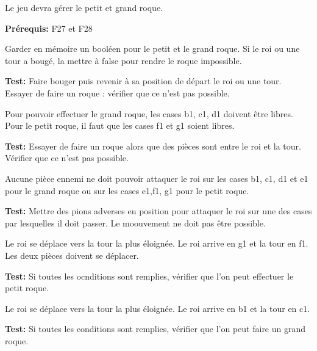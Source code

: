 \documentclass{article}
\begin{document}
\begin{needbox}[F30. Roque]
    Le jeu devra gérer le petit et grand roque.

    \textbf{Prérequis:} F27 et F28
    \begin{subneedbox}
        Garder en mémoire un booléen pour le petit et le grand roque.
        Si le roi ou une tour a bougé, la mettre à false pour rendre le roque impossible.

        \textbf{Test:} Faire bouger puis revenir à sa position de départ
         le roi ou une tour. Essayer de faire un roque : vérifier que ce n'est pas possible.
    \end{subneedbox}
    \begin{subneedbox}
        Pour pouvoir effectuer le grand roque, les cases b1, c1, d1 doivent être libres.
        Pour le petit roque, il faut que les cases f1 et g1 soient libres.

        \textbf{Test:} Essayer de faire un roque alors que des pièces sont entre
        le roi et la tour. Vérifier que ce n'est pas possible.
    \end{subneedbox}
    \begin{subneedbox}
        Aucune pièce ennemi ne doit pouvoir attaquer le roi sur les cases b1, c1, d1 
        et e1 pour le grand roque ou sur les cases e1,f1, g1 pour le petit roque.

        \textbf{Test:} Mettre des pions adverses en position pour attaquer le roi sur une des cases
        par lesquelles il doit passer. Le moouvement ne doit pas être possible.
    \end{subneedbox}
    \begin{subneedbox}
        Le roi se déplace vers la tour la plus éloignée. Le roi arrive en g1 et 
        la tour en f1. Les deux pièces doivent se déplacer.

        \textbf{Test:} Si toutes les ocnditions sont remplies, vérifier que l'on
         peut effectuer le petit roque.
    \end{subneedbox}
    \begin{subneedbox}
        Le roi se déplace vers la tour la plus éloignée. Le roi arrive en b1 et la tour en c1.

        \textbf{Test:} Si toutes les conditions sont remplies, vérifier que l'on peut faire
        un grand roque.
    \end{subneedbox}
\end{needbox}
\end{document}
